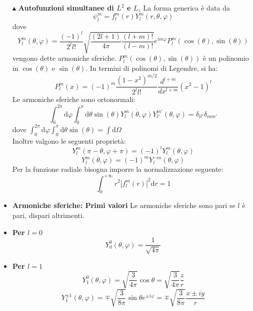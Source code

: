 \documentclass{book}
\newcommand{\g}{\textbf}
\newcommand{\e}{\begin{equation}}
\newcommand{\ex}{\end{equation} }
\renewcommand{\it}{\item[$\cdot$]}
\begin{document}
\begin{multicols}{4}
\begin{itemize}
\item [$\blacktriangle$] \g{Autofunzioni simultanee di $L^{2}$ e $L_{z}$}
La forma generica è data da 
\e{\psi_{l}^{m} = f_{l}^{m}(r)Y_{l}^{m}(r,\theta,\varphi) \label{autofunzioni simultanee L2 e Lz}}\ex
dove 
    \e{Y^m_l(\theta, \varphi) = \frac{(-1)^{l}}{2^{l}l!}\sqrt{\frac{(2l + 1)}{4\pi} \frac{(l + m)!}{(l - m)!}}e^{im\varphi} P^m_l(\cos(\theta), \sin(\theta)) } \ex
    vengono dette armoniche sferiche. $P^m_l(\cos(\theta), \sin(\theta))$ è un polinomio in $\cos(\theta)$ e $\sin(\theta)$. In termini di polinomi di Legendre, si ha:
    \e{P^m_l(x) = (-1)^m \frac{(1 - x^2)^{m/2}}{2^l l!} \frac{d^{l+m}}{dx^{l+m}} (x^2 - 1)^l} \ex
    Le armoniche sferiche sono ortonormali:
    \e{\int_{0}^{2\pi}\text{d}\varphi\int_{0}^{\pi}\text{d}\theta \sin(\theta)\overline{Y_{l}^{m}(\theta,\varphi)}Y_{l'}^{m'}(\theta,\varphi) = \delta_{ll'}\delta_{mm'}}\ex
    dove $\int_{0}^{2\pi}\text{d}\varphi\int_{0}^{\pi}\text{d}\theta \sin(\theta) = \int\text{d}\Omega$\\
    Inoltre valgono le seguenti proprietà:
    \e{Y_{l}^{m}(\pi - \theta,\varphi + \pi) = (-1)^{l}Y_{l}^{m}(\theta,\varphi)}\ex
    \e{\overline{Y_{l}^{m}(\theta,\varphi)} = (-1)^{m}Y_{l}^{-m}(\theta,\varphi)}\ex
    Per la funzione radiale bisogna imporre la normalizzazione seguente:
    \e{\int_{0}^{+\infty} r^{2} |f_{l}^{m}(r)|^{2}\text{d}r = 1}\ex
\it \g{Armoniche sferiche: Primi valori}
    Le armoniche sferiche sono pari se $l$ è pari, dispari altrimenti.

    \it \g{Per $l = 0$}
        \e{Y^0_0(\theta, \varphi) = \frac{1}{\sqrt{4\pi}}} \ex

    \it \g{Per $l = 1$}
        \e{Y^0_1(\theta, \varphi) = \sqrt{\frac{3}{4\pi}} \cos\theta = \sqrt{\frac{3}{4\pi}} \frac{z}{r}} \ex
        \e{Y^{\pm 1}_1(\theta, \varphi) = \mp \sqrt{\frac{3}{8\pi}} \sin\theta e^{\pm i\varphi} = \mp \sqrt{\frac{3}{8\pi}} \frac{x \pm iy}{r}} \ex


\end{itemize}
\end{multicols}
\end{document}
